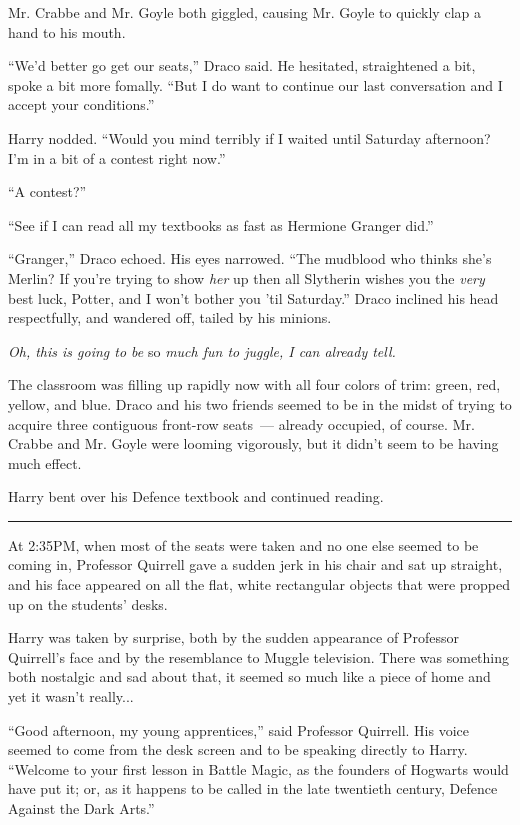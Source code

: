 Mr. Crabbe and Mr. Goyle both giggled, causing Mr. Goyle to quickly clap a hand to his mouth.

``We'd better go get our seats,'' Draco said. He hesitated, straightened a bit, spoke a bit more fomally. ``But I do want to continue our last conversation and I accept your conditions.''

Harry nodded. ``Would you mind terribly if I waited until Saturday afternoon? I'm in a bit of a contest right now.''

``A contest?''

``See if I can read all my textbooks as fast as Hermione Granger did.''

``Granger,'' Draco echoed. His eyes narrowed. ``The mudblood who thinks she's Merlin? If you're trying to show \emph{her} up then all Slytherin wishes you the \emph{very} best luck, Potter, and I won't bother you 'til Saturday.'' Draco inclined his head respectfully, and wandered off, tailed by his minions.

\emph{Oh, this is going to be} so \emph{much fun to juggle, I can already tell.}

The classroom was filling up rapidly now with all four colors of trim: green, red, yellow, and blue. Draco and his two friends seemed to be in the midst of trying to acquire three contiguous front-row seats~--- already occupied, of course. Mr. Crabbe and Mr. Goyle were looming vigorously, but it didn't seem to be having much effect.

Harry bent over his Defence textbook and continued reading.

\begin{center}\rule{3in}{0.4pt}\end{center}

At 2:35PM, when most of the seats were taken and no one else seemed to be coming in, Professor Quirrell gave a sudden jerk in his chair and sat up straight, and his face appeared on all the flat, white rectangular objects that were propped up on the students' desks.

Harry was taken by surprise, both by the sudden appearance of Professor Quirrell's face and by the resemblance to Muggle television. There was something both nostalgic and sad about that, it seemed so much like a piece of home and yet it wasn't really...

``Good afternoon, my young apprentices,'' said Professor Quirrell. His voice seemed to come from the desk screen and to be speaking directly to Harry. ``Welcome to your first lesson in Battle Magic, as the founders of Hogwarts would have put it; or, as it happens to be called in the late twentieth century, Defence Against the Dark Arts.''


